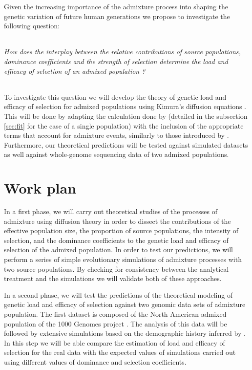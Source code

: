 \documentclass[a4paper, 12pt]{article}
\begin{document}
Given the increasing importance of the admixture process into shaping the
genetic variation of future human generations we propose to investigate the
following question: 
\\\

\textit{How does the interplay between the relative contributions
  of source populations, dominance coefficients and the strength of selection
  determine the load and efficacy of selection of an admixed population ?}
\\\

To investigate this question  we will develop the theory of genetic load and
efficacy of selection for admixed populations using Kimura's diffusion
equations . This will be done by adapting the calculation done by
\cite{Gravel2016} (detailed in the subsection \ref{sec:fit} for the case of a
single population) with the inclusion of the appropriate terms that account for
admixture events,  similarly to those introduced by \cite{Jouganous2017}.
Furthermore, our theoretical predictions will be tested against simulated
datasets as well against whole-genome sequencing data of two admixed
populations.   

\section{Work plan}

In a first phase, we will carry out theoretical studies of the processes of
admixture using diffusion theory in order to dissect the contributions of the
effective population size, the proportion of source populations, the intensity
of selection, and the dominance coefficients to the genetic load and efficacy
of selection of the admixed population. In order to test our predictions, we
will perform a series of simple evolutionary simulations of admixture processes
with two source populations. By checking for consistency between the analytical
treatment and the simulations we will validate both of these approaches. 

In a second phase, we will test the predictions of the theoretical modeling of
genetic load and efficacy of selection against two genomic data sets of
admixture population. The first dataset is composed of the North American admixed
population of the 1000 Genomes project \cite{1000Genomes2015}. The analysis of
this data will be followed by extensive simulations based on the demographic
history inferred by \citep{Gravel2013}.  In this step we
will be able compare the estimation of load and efficacy of selection for the
real data with the expected values of simulations carried out using different
values of dominance and selection coefficients. 
\end{document}
